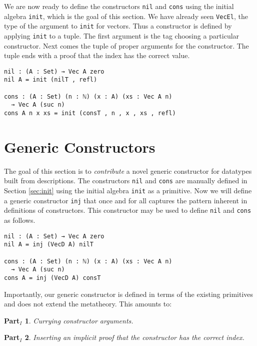 \documentclass[preprint,nonatbib]{sigplanconf}
\newtheorem{myparti}{Part$_I$}
\newcommand{\refsec}[1]{Section \ref{sec:#1}}
\begin{document}
We are now ready to define the constructors {\tt nil} and
{\tt cons} using the initial algebra {\tt init}, which is the goal of
this section.
We have already seen
{\tt VecEl}, the type of the argument to {\tt init} for vectors.
Thus a constructor is defined by applying {\tt init} to a tuple. The
first argument is the tag choosing a particular constructor. Next comes
the tuple of proper arguments for the constructor. The tuple
ends with a proof that the index has the correct value.

\begin{verbatim}
nil : (A : Set) → Vec A zero
nil A = init (nilT , refl)

cons : (A : Set) (n : ℕ) (x : A) (xs : Vec A n)
  → Vec A (suc n)
cons A n x xs = init (consT , n , x , xs , refl)
\end{verbatim}

\section{Generic Constructors}
\label{sec:inj}

The goal of this section is to {\it contribute} a novel generic
constructor for datatypes built from descriptions.
The constructors {\tt nil} and {\tt cons} are manually
defined in \refsec{init} using the initial algebra
{\tt init} as a primitive. Now we will define a generic constructor
{\tt inj} that once and for all captures the pattern inherent in
definitions of constructors.  This constructor
may be used to define {\tt nil} and {\tt cons} as follows.

\begin{verbatim}
nil : (A : Set) → Vec A zero
nil A = inj (VecD A) nilT

cons : (A : Set) (n : ℕ) (x : A) (xs : Vec A n)
  → Vec A (suc n)
cons A = inj (VecD A) consT
\end{verbatim}

Importantly, our generic constructor is
defined in terms of the existing primitives and does not extend the
metatheory.
This amounts to:

\begin{myparti}
\label{parti:one}
Currying constructor arguments.
\end{myparti}

\begin{myparti}
\label{parti:two}
Inserting an implicit proof that the constructor has the correct index.
\end{myparti}
\end{document}
